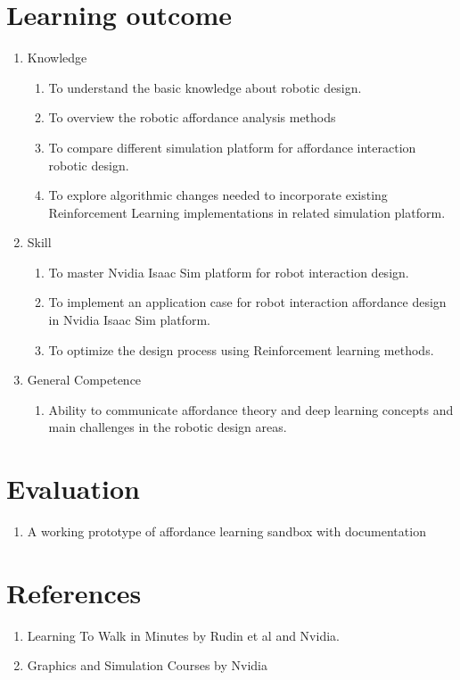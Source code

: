 \documentclass[letterpaper,12pt]{article}
\begin{document}
\section{Learning outcome}

\begin{enumerate}
	\item Knowledge
	\begin{enumerate}
		\item To understand the basic knowledge about robotic design.
		\item To overview the robotic affordance analysis methods
		\item To compare different simulation platform for affordance interaction robotic design. 
        \item To explore algorithmic changes needed to incorporate existing Reinforcement Learning implementations in related simulation platform.
	\end{enumerate}
	\item Skill
	\begin{enumerate}
		\item To master Nvidia Isaac Sim platform for robot interaction design.
		\item To implement an application case for robot interaction affordance design in Nvidia Isaac Sim platform. 
        \item To optimize the design process using Reinforcement learning methods.
  
	\end{enumerate}
	\item General Competence
	\begin{enumerate}
		\item Ability to communicate affordance theory and deep learning concepts and main challenges in the robotic design areas.
	\end{enumerate}
\end{enumerate}

\section{Evaluation}

\begin{enumerate}
	\item A working prototype of affordance learning sandbox with documentation
\end{enumerate}

\section{References}

\begin{enumerate}
	\item Learning To Walk in Minutes by Rudin et al and Nvidia.
	\item Graphics and Simulation Courses by Nvidia
\end{enumerate}
\end{document}
